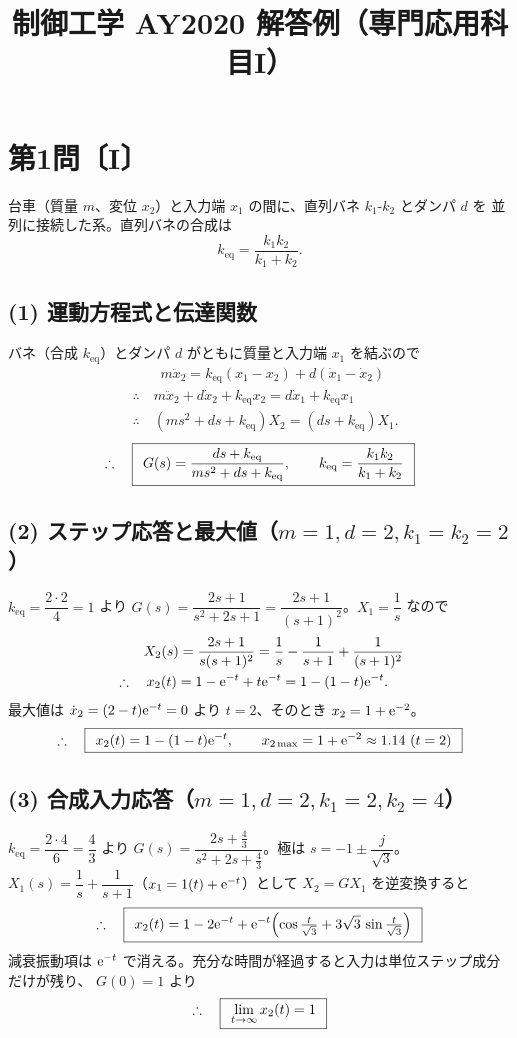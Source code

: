 \documentclass[11pt,a4paper]{article}
\title{制御工学 AY2020 解答例（専門応用科目I）}
\author{}
\date{}
\begin{document}
\maketitle

\section*{第1問〔I〕}

台車（質量 $m$、変位 $x_2$）と入力端 $x_1$ の間に、直列バネ $k_1$-$k_2$ とダンパ $d$ を
並列に接続した系。直列バネの合成は
\[
  k_{\mathrm{eq}}=\frac{k_1k_2}{k_1+k_2}.
\]

\subsection*{(1) 運動方程式と伝達関数}
バネ（合成 $k_{\mathrm{eq}}$）とダンパ $d$ がともに質量と入力端 $x_1$ を結ぶので
\begin{align*}
  &\qquad m\ddot{x}_2=k_{\mathrm{eq}}(x_1-x_2)+d(\dot{x}_1-\dot{x}_2)\\
  &\therefore\quad m\ddot{x}_2+d\dot{x}_2+k_{\mathrm{eq}}x_2=d\dot{x}_1+k_{\mathrm{eq}}x_1\\
  &\therefore\quad (ms^2+ds+k_{\mathrm{eq}})X_2=(ds+k_{\mathrm{eq}})X_1.
\end{align*}
\[
  \therefore\quad \boxed{\,\;G(s)=\dfrac{ds+k_{\mathrm{eq}}}{ms^2+ds+k_{\mathrm{eq}}},\qquad k_{\mathrm{eq}}=\dfrac{k_1k_2}{k_1+k_2}\;\,}
\]

\subsection*{(2) ステップ応答と最大値（$m=1,d=2,k_1=k_2=2$）}
$k_{\mathrm{eq}}=\dfrac{2\cdot2}{4}=1$ より $G(s)=\dfrac{2s+1}{s^2+2s+1}=\dfrac{2s+1}{(s+1)^2}$。$X_1=\dfrac1s$ なので
\begin{align*}
  &\qquad X_2(s)=\frac{2s+1}{s(s+1)^2}=\frac1s-\frac{1}{s+1}+\frac{1}{(s+1)^2}\\
  &\therefore\quad x_2(t)=1-\mathrm{e}^{-t}+t\mathrm{e}^{-t}=1-(1-t)\mathrm{e}^{-t}.
\end{align*}
最大値は $\dot{x}_2=(2-t)\mathrm{e}^{-t}=0$ より $t=2$、そのとき $x_2=1+\mathrm{e}^{-2}$。
\[
  \therefore\quad \ans{\;x_2(t)=1-(1-t)\e^{-t},\qquad x_{2\max}=1+\e^{-2}\approx1.14\ (t=2)\;}
\]

\subsection*{(3) 合成入力応答（$m=1,d=2,k_1=2,k_2=4$）}
$k_{\mathrm{eq}}=\dfrac{2\cdot4}{6}=\dfrac43$ より $G(s)=\dfrac{2s+\frac43}{s^2+2s+\frac43}$。極は $s=-1\pm\dfrac{j}{\sqrt3}$。
$X_1(s)=\dfrac1s+\dfrac{1}{s+1}$（$x_1=1(t)+\mathrm{e}^{-t}$）として $X_2=G X_1$ を逆変換すると
\[
  \therefore\quad \boxed{\,\;x_2(t)=1-2\mathrm{e}^{-t}+\mathrm{e}^{-t}\!\left(\cos\tfrac{t}{\sqrt3}+3\sqrt3\,\sin\tfrac{t}{\sqrt3}\right)\;\,}
\]
減衰振動項は $\mathrm{e}^{-t}$ で消える。充分な時間が経過すると入力は単位ステップ成分だけが残り、
$G(0)=1$ より
\[
  \therefore\quad \boxed{\,\;\lim_{t\to\infty}x_2(t)=1\;\,}
\]
\end{document}
